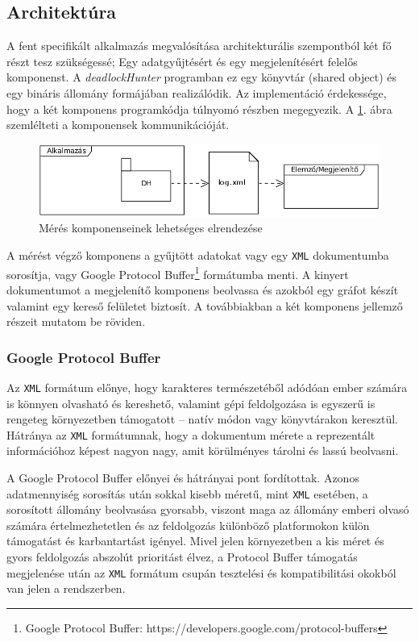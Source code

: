     \subsection{Architektúra}
    A fent specifikált alkalmazás megvalósítása architekturális szempontból két fő részt tesz szükségessé; Egy adatgyűjtésért és egy megjelenítésért felelős komponenst. A \emph{deadlockHunter} programban ez egy könyvtár (shared object) és egy bináris állomány formájában realizálódik. Az implementáció érdekessége, hogy a két komponens programkódja túlnyomó részben megegyezik. A \ref{fig:architecture}. ábra szemlélteti a komponensek kommunikációját.
    
\begin{figure}[ht!]
  \centering
    \includegraphics[width=5.4in]{figures/arch}
  \caption{Mérés komponenseinek lehetséges elrendezése}
  \label{fig:architecture}
\end{figure}    
%    
    A mérést végző komponens a gyűjtött adatokat vagy egy \texttt{XML} dokumentumba sorosítja, vagy Google Protocol Buffer\footnote{Google Protocol Buffer: https://developers.google.com/protocol-buffers} formátumba menti. A kinyert dokumentumot a megjelenítő komponens beolvassa és azokból egy gráfot készít valamint egy kereső felületet biztosít. A továbbiakban a két komponens jellemző részeit mutatom be röviden.
    
    \subsubsection{Google Protocol Buffer}
    Az \texttt{XML} formátum előnye, hogy karakteres természetéből adódóan ember számára is könnyen olvasható és kereshető, valamint gépi feldolgozása is egyszerű is rengeteg környezetben támogatott -- natív módon vagy könyvtárakon keresztül. Hátránya az \texttt{XML} formátumnak, hogy a dokumentum mérete a reprezentált információhoz képest nagyon nagy, amit körülményes tárolni és lassú beolvasni.
    
    A Google Protocol Buffer előnyei és hátrányai pont fordítottak. Azonos adatmennyiség sorosítás után sokkal kisebb méretű, mint \texttt{XML} esetében, a sorosított állomány beolvasása gyorsabb, viszont maga az állomány emberi olvasó számára értelmezhetetlen és az feldolgozás különböző platformokon külön támogatást és karbantartást igényel. Mivel jelen környezetben a kis méret és gyors feldolgozás abszolút prioritást élvez, a Protocol Buffer támogatás megjelenése után az \texttt{XML} formátum csupán tesztelési és kompatibilitási okokból van jelen a rendszerben.
    
